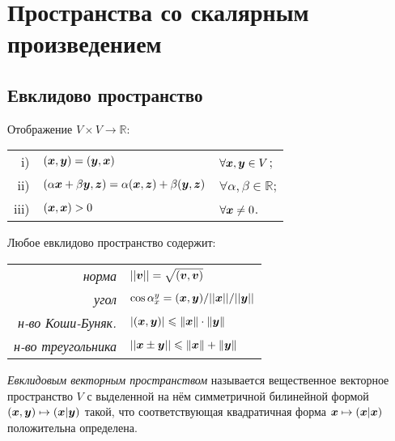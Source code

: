 \section{Пространства со скалярным произведением}

\subsection{Евклидово пространство}

\begin{minipage}[t]{0.4\textwidth}
    \begin{to_def}
    Отображение $V \times V \to \mathbb{R}$:\\
        \begin{tabular}{r|ll}
            i) & $(\mbox{\boldmath $x$}, \mbox{\boldmath $y$}) = (\mbox{\boldmath $y$}, \mbox{\boldmath $x$})$ & $\forall \mbox{\boldmath $x$}, \mbox{\boldmath $y$} \in V$; \\
            ii) & $(\alpha \mbox{\boldmath $x$} + \beta \mbox{\boldmath $y$}, \mbox{\boldmath $z$}) = \alpha (\mbox{\boldmath $x$}, \mbox{\boldmath $z$}) + \beta (\mbox{\boldmath $y$}, \mbox{\boldmath $z$})$ & $\forall \alpha, \beta \in \mathbb{R}$; \\
            iii) & $(\mbox{\boldmath $x$}, \mbox{\boldmath $x$}) > 0$ & $\forall \mbox{\boldmath $x$} \neq 0$. \\
        \end{tabular}
    \end{to_def}
\end{minipage}
\hfill
\begin{minipage}[t]{0.45\textwidth}
    \noindent
    Любое евклидово пространство содержит:\\
    \begin{tabular}{rl}
        \textit{норма }              & $||\mbox{\boldmath $v$}|| = \sqrt{(\mbox{\boldmath $v$}, \mbox{\boldmath $v$})}$ \\
        \textit{угол }               & $\cos \alpha_{{x}}^{{y}} = (\mbox{\boldmath $x$}, \mbox{\boldmath $y$}) / ||\mbox{\boldmath $x$}|| / ||\mbox{\boldmath $y$}||$ \\
        \textit{н-во Коши-Буняк.}    & $|(\mbox{\boldmath $x$}, \mbox{\boldmath $y$})| \leqslant \|\mbox{\boldmath $x$}\| \cdot \|\mbox{\boldmath $y$}\|$\\
        \textit{н-во треугольника}   & $||{\mbox{\boldmath $x$} \pm \mbox{\boldmath $y$}}|| \leqslant \|\mbox{\boldmath $x$}\| + \|\mbox{\boldmath $y$}\|$\\
    \end{tabular}
\end{minipage}


\begin{to_def} 
  \textit{Евклидовым векторным пространством} называется вещественное векторное пространство $V$ с выделенной на нём симметричной билинейной формой $(\mbox{\boldmath $x$}, \mbox{\boldmath $y$}) \mapsto (\mbox{\boldmath $x$} | \mbox{\boldmath $y$})$ такой, что соответствующая квадратичная форма $\mbox{\boldmath $x$} \mapsto (\mbox{\boldmath $x$} | \mbox{\boldmath $x$})$  положительна определена.
\end{to_def}


